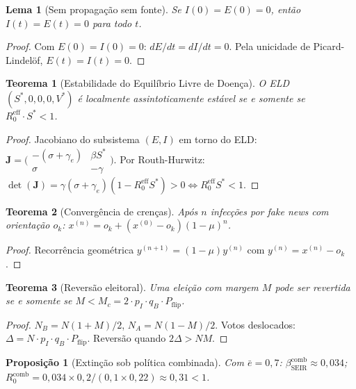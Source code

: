 \documentclass[12pt,a4paper]{article}
\theoremstyle{definition}
\theoremstyle{plain}
\newtheorem{lema}{Lema}
\newtheorem{proposicao}{Proposição}
\newtheorem{teorema}{Teorema}
\begin{document}
\begin{lema}[Sem propagação sem fonte]
Se $I(0) = E(0) = 0$, então $I(t) = E(t) = 0$ para todo $t$.
\end{lema}
\begin{proof}
Com $E(0)=I(0)=0$: $dE/dt = dI/dt = 0$. Pela unicidade de Picard-Lindelöf, $E(t)=I(t)=0$.
\end{proof}

\begin{teorema}[Estabilidade do Equilíbrio Livre de Doença]
\label{thm:dfe}
O ELD $(S^*, 0, 0, 0, V^*)$ é localmente assintoticamente estável se e somente se $R_0^{\text{eff}} \cdot S^* < 1$.
\end{teorema}
\begin{proof}
Jacobiano do subsistema $(E,I)$ em torno do ELD: $\mathbf{J} = \bigl(\begin{smallmatrix}-(\sigma+\gamma_e) & \beta S^*\\ \sigma & -\gamma\end{smallmatrix}\bigr)$. Por Routh-Hurwitz: $\det(\mathbf{J}) = \gamma(\sigma+\gamma_e)(1-R_0^{\text{eff}}S^*) > 0 \Leftrightarrow R_0^{\text{eff}}S^* < 1$.
\end{proof}

\begin{teorema}[Convergência de crenças]
\label{thm:convergence}
Após $n$ infecções por fake news com orientação $o_k$: $x^{(n)} = o_k + (x^{(0)} - o_k)(1-\mu)^n$.
\end{teorema}
\begin{proof}
Recorrência geométrica $y^{(n+1)} = (1-\mu)y^{(n)}$ com $y^{(n)} = x^{(n)}-o_k$.
\end{proof}

\begin{teorema}[Reversão eleitoral]
\label{thm:reversal}
Uma eleição com margem $M$ pode ser revertida se e somente se $M < M_c = 2 \cdot p_I \cdot q_B \cdot P_{\text{flip}}$.
\end{teorema}
\begin{proof}
$N_B = N(1+M)/2$, $N_A = N(1-M)/2$. Votos deslocados: $\Delta = N \cdot p_I \cdot q_B \cdot P_{\text{flip}}$. Reversão quando $2\Delta > NM$.
\end{proof}

\begin{proposicao}[Extinção sob política combinada]
Com $\bar{e} = 0{,}7$: $\beta_{\text{SEIR}}^{\text{comb}} \approx 0{,}034$; $R_0^{\text{comb}} = 0{,}034 \times 0{,}2 / (0{,}1 \times 0{,}22) \approx 0{,}31 < 1$.
\end{proposicao}
\end{document}
